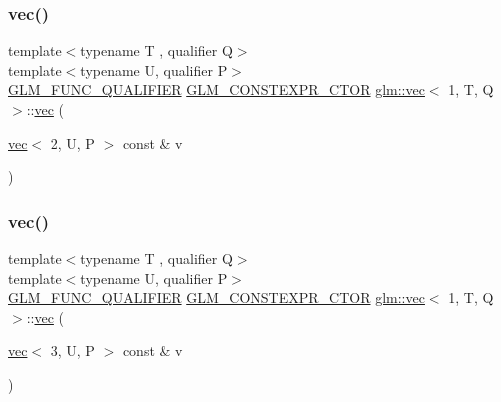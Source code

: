 \mbox{\label{structglm_1_1vec_3_011_00_01_t_00_01_q_01_4_ab8eadeb013caada0e6a27cfa842ca8da}} 
\subsubsection{\texorpdfstring{vec()}{vec()}\hspace{0.1cm}{\footnotesize\ttfamily [12/14]}}
{\footnotesize\ttfamily template$<$typename T , qualifier Q$>$ \\
template$<$typename U, qualifier P$>$ \\
\hyperlink{setup_8hpp_a33fdea6f91c5f834105f7415e2a64407}{G\+L\+M\+\_\+\+F\+U\+N\+C\+\_\+\+Q\+U\+A\+L\+I\+F\+I\+ER} \hyperlink{setup_8hpp_ad34178a09666081abdb573c14d1f4a5a}{G\+L\+M\+\_\+\+C\+O\+N\+S\+T\+E\+X\+P\+R\+\_\+\+C\+T\+OR} \hyperlink{structglm_1_1vec}{glm\+::vec}$<$ 1, T, Q $>$\+::\hyperlink{structglm_1_1vec}{vec} (\begin{DoxyParamCaption}\item[{\hyperlink{structglm_1_1vec}{vec}$<$ 2, U, P $>$ const \&}]{v }\end{DoxyParamCaption})}

\mbox{\label{structglm_1_1vec_3_011_00_01_t_00_01_q_01_4_adb99870d209d6225f67a5d12e8f04df5}} 
\subsubsection{\texorpdfstring{vec()}{vec()}\hspace{0.1cm}{\footnotesize\ttfamily [13/14]}}
{\footnotesize\ttfamily template$<$typename T , qualifier Q$>$ \\
template$<$typename U, qualifier P$>$ \\
\hyperlink{setup_8hpp_a33fdea6f91c5f834105f7415e2a64407}{G\+L\+M\+\_\+\+F\+U\+N\+C\+\_\+\+Q\+U\+A\+L\+I\+F\+I\+ER} \hyperlink{setup_8hpp_ad34178a09666081abdb573c14d1f4a5a}{G\+L\+M\+\_\+\+C\+O\+N\+S\+T\+E\+X\+P\+R\+\_\+\+C\+T\+OR} \hyperlink{structglm_1_1vec}{glm\+::vec}$<$ 1, T, Q $>$\+::\hyperlink{structglm_1_1vec}{vec} (\begin{DoxyParamCaption}\item[{\hyperlink{structglm_1_1vec}{vec}$<$ 3, U, P $>$ const \&}]{v }\end{DoxyParamCaption})}

